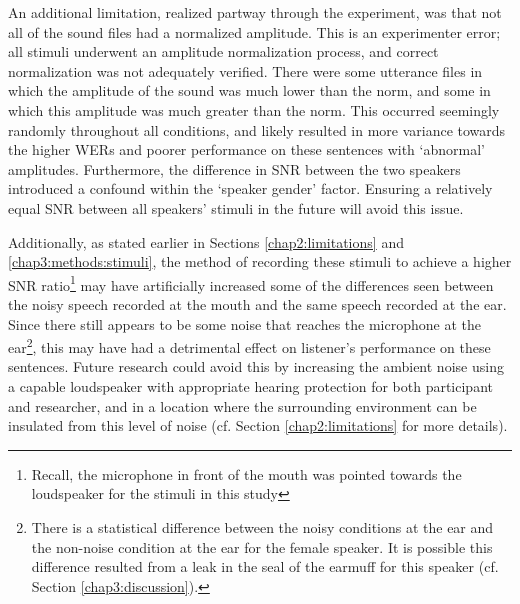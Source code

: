 An additional limitation, realized partway through the experiment, was that not all of the sound files had a normalized amplitude.  This is an experimenter error; all stimuli underwent an amplitude normalization process, and correct normalization was not adequately verified. There were some utterance files in which the amplitude of the sound was much lower than the norm, and some in which this amplitude was much greater than the norm.  This occurred seemingly randomly throughout all conditions, and likely resulted in more variance towards the higher WERs and poorer performance on these sentences with `abnormal' amplitudes.  Furthermore, the difference in SNR between the two speakers introduced a confound within the `speaker gender' factor.  Ensuring a relatively equal SNR between all speakers' stimuli in the future will avoid this issue.

Additionally, as stated earlier in Sections \ref{chap2:limitations} and \ref{chap3:methods:stimuli}, the method of recording these stimuli to achieve a higher SNR ratio\footnote{Recall, the microphone in front of the mouth was pointed towards the loudspeaker for the stimuli in this study} may have artificially increased some of the differences seen between the noisy speech recorded at the mouth and the same speech recorded at the ear.  Since there still appears to be some noise that reaches the microphone at the ear\footnote{There is a statistical difference between the noisy conditions at the ear and the non-noise condition at the ear for the female speaker. It is possible this difference resulted from a leak in the seal of the earmuff for this speaker (cf. Section \ref{chap3:discussion}).}, this may have had a detrimental effect on listener's performance on these sentences.  Future research could avoid this by increasing the ambient noise using a capable loudspeaker with appropriate hearing protection for both participant and researcher, and in a location where the surrounding environment can be insulated from this level of noise (cf. Section \ref{chap2:limitations} for more details).




